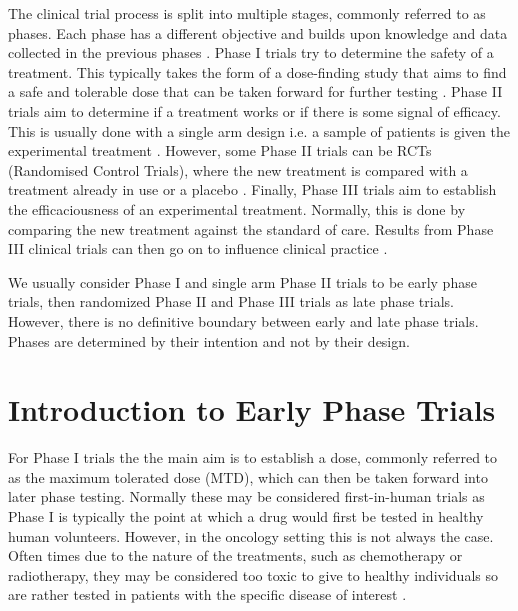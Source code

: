 The clinical trial process is split into multiple stages, commonly referred to as phases. Each phase has a different objective and builds upon knowledge and data collected in the previous phases \cite{wrightChapterClinicalTrial2017}. Phase I trials try to determine the safety of a treatment. This typically takes the form of a dose-finding study that aims to find a safe and tolerable dose that can be taken forward for further testing \cite{iasonosRandomisedPhaseClinical2021}. Phase II trials aim to determine if a treatment works or if there is some signal of efficacy. This is usually done with a single arm design i.e. a sample of patients is given the experimental treatment \cite{esteyNewDesignsPhase2003}. However, some Phase II trials can be RCTs (Randomised Control Trials), where the new treatment is compared with a treatment already in use or a placebo \cite{mandrekarRandomizedPhaseII2010}. Finally, Phase III trials aim to establish the efficaciousness of an experimental treatment. Normally, this is done by comparing the new treatment against the standard of care. Results from Phase III clinical trials can then go on to 
influence clinical practice \cite{umscheidKeyConceptsClinical2011}.

We usually consider Phase I and single arm Phase II trials to be early phase trials, then randomized Phase II and Phase III trials as late phase trials. However, there is no definitive boundary between early and late phase trials. Phases are determined by their intention and not by their design.

\section{Introduction to Early Phase Trials}

For Phase \RN{1} trials the the main aim is to establish a dose, commonly referred to as the maximum tolerated dose (MTD), which can then be taken forward into later phase testing. Normally these may be considered first-in-human trials as Phase \RN{1} is typically the point at which a drug would first be tested in healthy human volunteers. However, in the oncology setting this is not always the case. Often times due to the nature of the treatments, such as chemotherapy or radiotherapy, they may be considered too toxic to give to healthy individuals so are rather tested in patients with the specific disease of interest \cite{salzbergFirstinHumanPhaseStudies2012}. 


